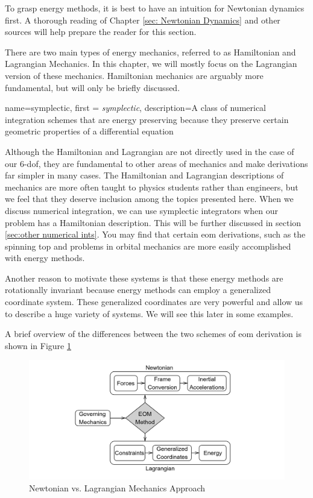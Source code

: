\documentclass[12pt]{report}
\begin{document}
To grasp energy methods, it is best to have an intuition for Newtonian dynamics first. A thorough reading of Chapter \ref{sec: Newtonian Dynamics} and other sources will help prepare the reader for this section.

There are two main types of energy mechanics, referred to as Hamiltonian and Lagrangian Mechanics. In this chapter, we will mostly focus on the Lagrangian version of these mechanics. Hamiltonian mechanics are arguably more fundamental, but will only be briefly discussed.

{
    name=symplectic,
    first = {\textit{symplectic}},
    description={A class of numerical integration schemes that are energy preserving because they preserve certain geometric properties of a differential equation}
}

Although the Hamiltonian and Lagrangian are not directly used in the case of our 6-\gls{dof}, they are fundamental to other areas of mechanics and make derivations far simpler in many cases. The Hamiltonian and Lagrangian descriptions of mechanics are more often taught to physics students rather than engineers, but we feel that they deserve inclusion among the topics presented here. When we discuss numerical integration, we can use \gls{symplectic} integrators when our problem has a Hamiltonian description. This will be further discussed in section \ref{sec:other numerical ints}. You may find that certain \gls{eom} derivations, such as the spinning top and problems in orbital mechanics are more easily accomplished with energy methods.

Another reason to motivate these systems is that these energy methods are rotationally invariant because energy methods can employ a generalized coordinate system. These generalized coordinates are very powerful and allow us to describe a huge variety of systems. We will see this later in some examples.

A brief overview of the differences between the two schemes of \gls{eom} derivation is shown in Figure \ref{fig:newt v lang}

\begin{figure}[ht]
    \centering
    
\includegraphics[width=\linewidth]{Images/diagram-20250322.png}

    \caption{Newtonian vs. Lagrangian Mechanics Approach}
    \label{fig:newt v lang}
\end{figure}
\end{document}
